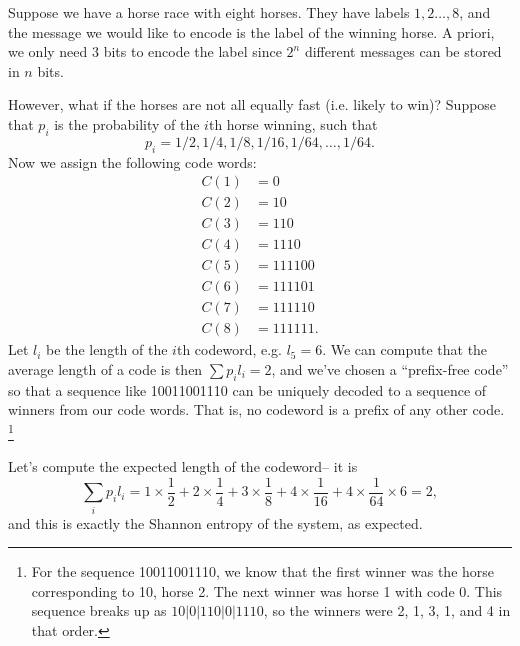 \begin{exm}
    Suppose we have a horse race with eight horses. They have labels $1,2\ldots, 8$, and the message we would like to encode is the label of the winning horse. A priori, we only need $3$ bits to encode the label since $2^n$ different messages can be stored in $n$ bits.
    
    However, what if the horses are not all equally fast (i.e. likely to win)? Suppose that $p_i$ is the probability of the $i$th horse winning, such that
    \begin{equation*}
        p_i=1/2,1/4,1/8,1/16,1/64,\ldots,1/64.
    \end{equation*}
    Now we assign the following code words:
    \begin{align*}
        C(1)&=0\\
        C(2)&=10\\
        C(3)&=110\\
        C(4)&=1110\\
        C(5)&=111100\\
        C(6)&=111101\\
        C(7)&=111110\\
        C(8)&=111111.
    \end{align*}
    Let $l_i$ be the length of the $i$th codeword, e.g. $l_5=6$. We can compute that the average length of a code is then $\sum p_i l_i = 2$, and we've chosen a ``prefix-free code'' so that a sequence like 10011001110 can be uniquely decoded to a sequence of winners from our code words. That is, no codeword is a prefix of any other code.%
        \footnote{For the sequence 10011001110, we know that the first winner was the horse corresponding to 10, horse 2. The next winner was horse 1 with code 0. This sequence breaks up as $10|0|110|0|1110$, so the winners were 2, 1, 3, 1, and 4 in that order.}
        
    Let's compute the expected length of the codeword-- it is
    \begin{equation}
        \sum_i p_i l_i=1\times \frac{1}{2}+2\times \frac{1}{4}+3\times \frac{1}{8} + 4 \times \frac{1}{16}+4 \times \frac{1}{64}\times 6=2,
    \end{equation}
    and this is exactly the Shannon entropy of the system, as expected.
\end{exm}